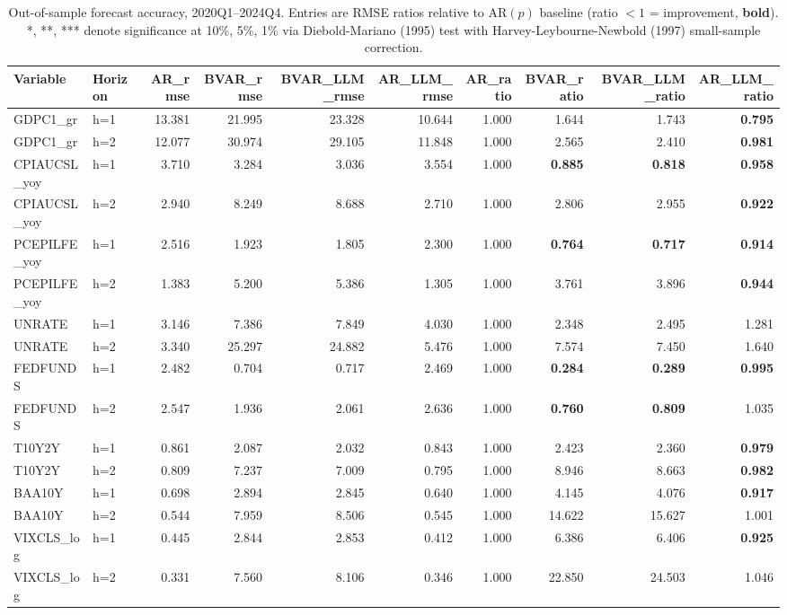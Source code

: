 \begin{table}[htbp]
\centering
\small
\caption{Out-of-sample forecast accuracy, 2020Q1--2024Q4. Entries are RMSE ratios relative to AR$(p)$ baseline (ratio $<1$ = improvement, \textbf{bold}). *, **, *** denote significance at 10\%, 5\%, 1\% via Diebold-Mariano (1995) test with Harvey-Leybourne-Newbold (1997) small-sample correction.}
\label{tab:main_results}
\begin{tabular}{llrrrrrrrr}
\toprule
Variable & Horizon & AR_rmse & BVAR_rmse & BVAR_LLM_rmse & AR_LLM_rmse & AR_ratio & BVAR_ratio & BVAR_LLM_ratio & AR_LLM_ratio \\
\midrule
GDPC1_gr & h=1 & 13.381 & 21.995 & 23.328 & 10.644 & 1.000 & 1.644 & 1.743 & \textbf{0.795} \\
GDPC1_gr & h=2 & 12.077 & 30.974 & 29.105 & 11.848 & 1.000 & 2.565 & 2.410 & \textbf{0.981} \\
CPIAUCSL_yoy & h=1 & 3.710 & 3.284 & 3.036 & 3.554 & 1.000 & \textbf{0.885} & \textbf{0.818} & \textbf{0.958} \\
CPIAUCSL_yoy & h=2 & 2.940 & 8.249 & 8.688 & 2.710 & 1.000 & 2.806 & 2.955 & \textbf{0.922} \\
PCEPILFE_yoy & h=1 & 2.516 & 1.923 & 1.805 & 2.300 & 1.000 & \textbf{0.764} & \textbf{0.717} & \textbf{0.914} \\
PCEPILFE_yoy & h=2 & 1.383 & 5.200 & 5.386 & 1.305 & 1.000 & 3.761 & 3.896 & \textbf{0.944} \\
UNRATE & h=1 & 3.146 & 7.386 & 7.849 & 4.030 & 1.000 & 2.348 & 2.495 & 1.281 \\
UNRATE & h=2 & 3.340 & 25.297 & 24.882 & 5.476 & 1.000 & 7.574 & 7.450 & 1.640 \\
FEDFUNDS & h=1 & 2.482 & 0.704 & 0.717 & 2.469 & 1.000 & \textbf{0.284} & \textbf{0.289} & \textbf{0.995} \\
FEDFUNDS & h=2 & 2.547 & 1.936 & 2.061 & 2.636 & 1.000 & \textbf{0.760} & \textbf{0.809} & 1.035 \\
T10Y2Y & h=1 & 0.861 & 2.087 & 2.032 & 0.843 & 1.000 & 2.423 & 2.360 & \textbf{0.979} \\
T10Y2Y & h=2 & 0.809 & 7.237 & 7.009 & 0.795 & 1.000 & 8.946 & 8.663 & \textbf{0.982} \\
BAA10Y & h=1 & 0.698 & 2.894 & 2.845 & 0.640 & 1.000 & 4.145 & 4.076 & \textbf{0.917} \\
BAA10Y & h=2 & 0.544 & 7.959 & 8.506 & 0.545 & 1.000 & 14.622 & 15.627 & 1.001 \\
VIXCLS_log & h=1 & 0.445 & 2.844 & 2.853 & 0.412 & 1.000 & 6.386 & 6.406 & \textbf{0.925} \\
VIXCLS_log & h=2 & 0.331 & 7.560 & 8.106 & 0.346 & 1.000 & 22.850 & 24.503 & 1.046 \\
\bottomrule
\end{tabular}
\end{table}